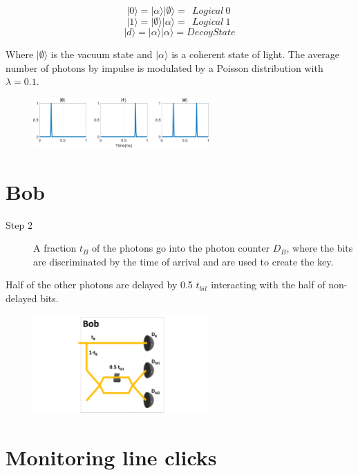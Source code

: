 \documentclass[1000pt]{article}
\newcommand{\mysection}[1]{\section*{\color{black}\sffamily #1}}%
\begin{document}
$$|0\rangle = |\alpha\rangle |\emptyset\rangle =\ \ Logical\ 0\ $$
  $$|1\rangle = |\emptyset\rangle |\alpha\rangle =\ \ Logical\ 1\ $$
$$|d\rangle = |\alpha\rangle |\alpha\rangle = Decoy State$$

Where $|\emptyset\rangle$ is the vacuum state and $|\alpha\rangle$ is a coherent state of light. The average number of photons by impulse is modulated by a Poisson distribution with $\lambda=0.1$.

    \begin{figure}[hbt]
    	\centering
\includegraphics[width=0.6\textwidth]{./figures/S1.pdf}
        	\label{bob}
    \end{figure}





\mysection{\Huge\textbf{Bob}} \Large \vspace*{1cm}

\begin{description}
  \item[Step 2] A fraction $t_B$ of the photons go into the photon counter $D_B$, where the bits are discriminated by the time of arrival and are used to create the key.
\end{description}  

Half of the other photons are delayed by 0.5 $t_{bit}$ interacting with the half of non-delayed bits.
    \begin{figure}[hbt]
    	\centering
    	\includegraphics[width=0.6\textwidth]{./figures/B.pdf}
    \end{figure}
\mysection{\Huge\textbf{Monitoring line clicks}} \Large \vspace*{1cm}
\end{document}
